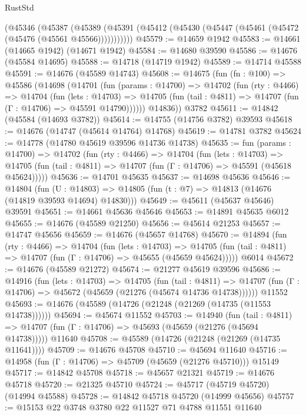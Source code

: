 \begin{lexlean}{RustStd}
\begin{coremodule}
    (@45346
      (@45387
        (@45389 (@45391 (@45412 (@45430 (@45447 (@45461 (@45472 (@45476 (@45561 @45566)))))))))))
@45579 := @14659 @1942
@45583 := @14661 (@14665 @1942) (@14671 @1942)
@45584 := @14680 @39590
@45586 := @14676 (@45584 @14695)
@45588 := @14718 (@14719 @1942)
@45589 := @14714 @45588
@45591 := @14676 (@45589 @14743)
@45608 := @14675
    (fun (fn : @100) =>
    @45586
      (@14698
        (@14701
          (fun (params : @14700) =>
          @14702
            (fun (rty : @4466) =>
            @14704
              (fun (lets : @14703) =>
              @14705 (fun (tail : @4811) => @14707 (fun (Γ : @14706) => @45591 @14790))))))
        @14836))
    @3782
@45611 := @14842 (@45584 (@14693 @3782))
@45614 := @14755 (@14756 @3782) @39593
@45618 := @14676 (@14747 (@45614 @14764) @14768)
@45619 := @14781 @3782
@45624 := @14778 (@14780 @45619 @39596 @14736 @14738)
@45635 := fun (params : @14700) =>
  @14702
    (fun (rty : @4466) =>
    @14704
      (fun (lets : @14703) =>
      @14705 (fun (tail : @4811) => @14707 (fun (Γ : @14706) => @45591 (@45618 @45624)))))
@45636 := @14701 @45635
@45637 := @14698 @45636
@45646 := @14804
    (fun (U : @14803) => @14805 (fun (t : @7) => @14813 (@14676 (@14819 @39593 @14694) @14830)))
@45649 := @45611 (@45637 @45646) @39591
@45651 := @14661 @45636 @45646
@45653 := @14891 @45635 @6012
@45655 := @14676 (@45589 @21250)
@45656 := @45614 @21253
@45657 := @14747 @45656
@45659 := @14676 (@45657 @14768)
@45670 := @14894
    (fun (rty : @4466) =>
    @14704
      (fun (lets : @14703) =>
      @14705 (fun (tail : @4811) => @14707 (fun (Γ : @14706) => @45655 (@45659 @45624)))))
    @6014
@45672 := @14676 (@45589 @21272)
@45674 := @21277 @45619 @39596
@45686 := @14916
    (fun (lets : @14703) =>
    @14705
      (fun (tail : @4811) =>
      @14707 (fun (Γ : @14706) => @45672 (@45659 (@21276 (@45674 @14736 @14738))))))
    @11552
@45693 := @14676 (@45589 (@14726 (@21248 (@21269 (@14735 (@11553 @14738))))))
@45694 := @45674 @11552
@45703 := @14940
    (fun (tail : @4811) => @14707 (fun (Γ : @14706) => @45693 (@45659 (@21276 (@45694 @14738)))))
    @11640
@45708 := @45589 (@14726 (@21248 (@21269 (@14735 @11641))))
@45709 := @14676 @45708
@45710 := @45694 @11640
@45716 := @14958 (fun (Γ : @14706) => @45709 (@45659 (@21276 @45710))) @15149
@45717 := @14842 @45708
@45718 := @45657 @21321
@45719 := @14676 @45718
@45720 := @21325 @45710
@45724 := @45717 (@45719 @45720) (@14994 @45588)
@45728 := @14842 @45718 @45720 (@14999 @45656)
@45757 := @15153
    @22
    @3748
    @3780
    @22
    @11527
    @71
    @4788
    @11551
    @11640

\end{coremodule}
\end{lexlean}
